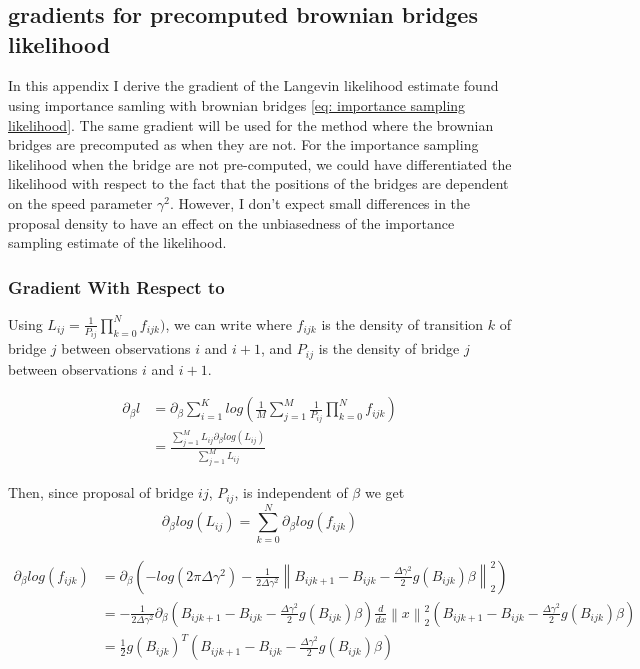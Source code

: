 \chapter{}
\label{Appendix: finding BB gradient}




\section{gradients for precomputed brownian bridges likelihood}

In this appendix I derive the gradient of the Langevin likelihood estimate found using importance samling with brownian bridges \ref{eq: importance sampling likelihood}. The same gradient will be used for the method where the brownian bridges are precomputed as when they are not. For the importance sampling likelihood when the bridge are not pre-computed, we could have differentiated the likelihood with respect to the fact that the positions of the bridges are dependent on the speed parameter $\gamma^2$. However, I don't expect small differences in the proposal density to have an effect on the unbiasedness of the importance sampling estimate of the likelihood.

\subsection{Gradient With Respect to \beta}
Using $L_{ij} = \frac{1}{P_{ij}}\prod_{k=0}^N f_{ijk})$,  we can write where $f_{ijk}$ is the density of transition $k$ of bridge $j$ between observations $i$ and $i+1$, and $P_{ij}$ is the density of bridge $j$ between observations $i$ and $i+1$.


\begin{equation} 
\begin{split}
\partial_\beta l & =  \partial_\beta \sum_{i=1}^K log(\frac{1}{M}\sum_{j=1}^M\frac{1}{P_{ij}}\prod_{k=0}^N f_{ijk}) \\
    & =  \frac{\sum_{j=1}^ML_{ij}\partial_\beta log(L_{ij})}{\sum_{j=1}^ML_{ij}}
\end{split}
\end{equation}


Then, since proposal of bridge $ij$, $P_{ij}$, is independent of $\beta$ we get
$$
\partial_\beta log(L_{ij}) =  \sum_{k=0}^N \partial_\beta log(f_{ijk})
$$


\begin{equation} 
\begin{split}
\partial_\beta log(f_{ijk}) & = \partial_\beta (-log(2\pi \Delta \gamma^2) - \frac{1}{2\Delta \gamma^2} \left\lVert B_{ijk+1} - B_{ijk} - \frac{\Delta\gamma^2}{2} g(B_{ijk})\beta \right\rVert_2^2) \\
& = -\frac{1}{2\Delta\gamma^2}\partial_\beta (B_{ijk+1} - B_{ijk} - \frac{\Delta\gamma^2}{2} g(B_{ijk})\beta) \frac{d}{dx} \left\lVert x \right\rVert_2^2(B_{ijk+1} - B_{ijk} - \frac{\Delta\gamma^2}{2} g(B_{ijk})\beta) \\
& = \frac{1}{2} g(B_{ijk})^T(B_{ijk+1} - B_{ijk} - \frac{\Delta\gamma^2}{2} g(B_{ijk})\beta)
\end{split}
\end{equation}




